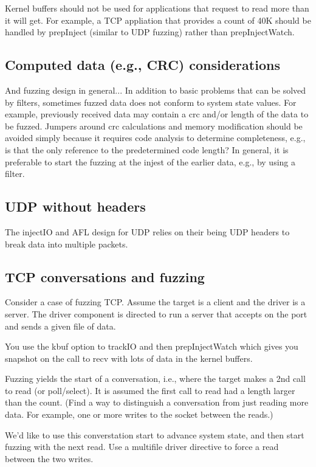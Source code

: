 \documentclass[titlepage]{article}
\begin{document}
\begin{appendices}
Kernel buffers should not be used for applications that request to read more than it will get.  For example, a TCP appliation that provides a count of 40K should be handled by
prepInject (similar to UDP fuzzing) rather than prepInjectWatch.

\subsection{Computed data (e.g., CRC) considerations}
And fuzzing design in general... In addition to basic problems that can be solved by filters, sometimes fuzzed data does not conform to system state values.
For example, previously received data may contain a crc and/or length of the data to be fuzzed.  Jumpers around crc calculations and memory modification should
be avoided simply because it requires code analysis to determine completeness, e.g., is that the only reference to the predetermined code length?  In general,
it is preferable to start the fuzzing at the injest of the earlier data, e.g., by using a filter.

\subsection{UDP without headers}
The injectIO and AFL design for UDP relies on their being UDP headers to break data into multiple packets.

\subsection{TCP conversations and fuzzing}
Consider a case of fuzzing TCP.  Assume the target is a client and the driver is a server.
The driver component is directed to run a server that accepts on the port and sends a given file of data.

You use the kbuf option to trackIO and then prepInjectWatch which gives you snapshot on the
call to recv with lots of data in the kernel buffers.

Fuzzing yields the start of a conversation, i.e., where the target makes a 2nd call to read (or poll/select).  It
is assumed the first call to read had a length larger than the count.  (Find a way to distinguish a conversation from
just reading more data.  For example, one or more writes to the socket between the reads.)

We'd like to use this converstation start to advance system state, and then start fuzzing with the next read.  Use a 
multifile driver directive to force a read between the two writes.


\end{appendices}
\end{document}
